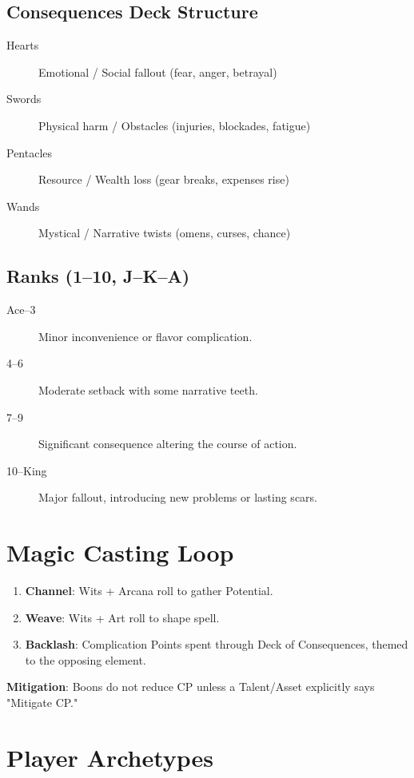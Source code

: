 \subsection{Consequences Deck Structure}

\begin{description}
\item[Hearts] Emotional / Social fallout (fear, anger, betrayal)
\item[Swords] Physical harm / Obstacles (injuries, blockades, fatigue)
\item[Pentacles] Resource / Wealth loss (gear breaks, expenses rise)
\item[Wands] Mystical / Narrative twists (omens, curses, chance)
\end{description}

\subsection{Ranks (1--10, J--K--A)}

\begin{description}
\item[Ace--3] Minor inconvenience or flavor complication.
\item[4--6] Moderate setback with some narrative teeth.
\item[7--9] Significant consequence altering the course of action.
\item[10--King] Major fallout, introducing new problems or lasting scars.
\end{description}

\section{Magic Casting Loop}

\begin{enumerate}
\item \textbf{Channel}: Wits + Arcana roll to gather Potential.
\item \textbf{Weave}: Wits + Art roll to shape spell.
\item \textbf{Backlash}: Complication Points spent through Deck of Consequences, themed to the opposing element.
\end{enumerate}

\textbf{Mitigation}: Boons do not reduce CP unless a Talent/Asset explicitly says "Mitigate CP."

\section{Player Archetypes}

